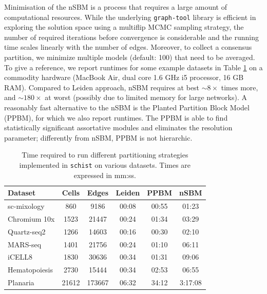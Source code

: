 \documentclass[10pt]{article}
\begin{document}
Minimisation of the nSBM is a process that requires a large amount of computational resources. While the underlying \texttt{graph-tool} library is efficient in exploring the solution space using a multiflip MCMC sampling strategy, the number of required iterations before convergence is considerable and the running time scales linearly with the number of edges. Moreover, to collect a consensus partition, we minimize multiple models (default: 100) that need to be averaged. To give a reference, we report runtimes for some example datasets in Table \ref{Table_runtime} on a commodity hardware (MacBook Air, dual core 1.6 GHz i5 processor, 16 GB RAM). Compared to Leiden approach, nSBM requires at best $\sim8\times$ times more, and $\sim180\times$  at worst (possibly due to limited memory for large networks). A reasonably fast alternative to the nSBM is the Planted Partition Block Model (PPBM), for which we also report runtimes. The PPBM \cite{Zhang_Peixoto_2020} is able to find statistically significant assortative modules and eliminates the resolution parameter; differently from nSBM, PPBM is not hierarchic.

\begin{table}[h!]
\centering
 \begin{tabular}{|| l c c c c c ||}
 \hline
 \textbf{Dataset} & \textbf{Cells} & \textbf{Edges} & \textbf{Leiden} & \textbf{PPBM} & \textbf{nSBM} \\ [0.5ex] 
 \hline\hline
 sc-mixology \cite{Tian_2019} & 860 & 9186 & 00:08 & 00:55 & 01:23 \\ 
 \hline
 Chromium 10x \cite{mereu_2020} & 1523 & 21447 & 00:24 & 01:34 & 03:29\\ 
 \hline
 Quartz-seq2 \cite{mereu_2020} & 1266 & 14603 & 00:16 & 00:30 & 02:10 \\
 \hline
 MARS-seq \cite{mereu_2020} & 1401 & 21756 & 00:24 & 01:10 & 06:11 \\
 \hline
 iCELL8 \cite{mereu_2020} & 1830 & 30636 & 00:34 & 01:31 & 09:06 \\
 \hline
 Hematopoiesis \cite{paul_2015} & 2730 & 15444 & 00:34 & 02:53 & 06:55\\ 
 \hline
 Planaria \cite{plass_2018} & 21612 & 173667 & 06:32 & 34:12 & 3:17:08 \\
 \hline
\end{tabular}
\caption{Time required to run different partitioning strategies implemented in \texttt{schist} on various datasets. Times are expressed in mm:ss. }
\label{Table_runtime}
\end{table}
\end{document}
